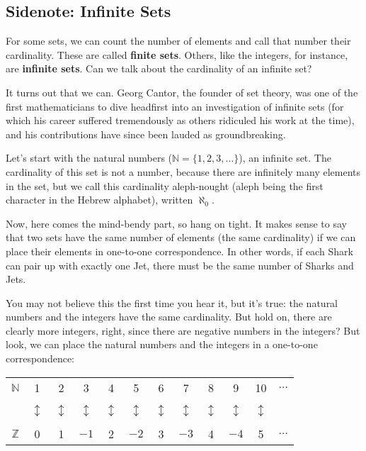 \subsection{Sidenote: Infinite Sets}
For some sets, we can count the number of elements and call that number their cardinality.  These are called \textbf{finite sets}.  Others, like the integers, for instance, are \textbf{infinite sets}.  Can we talk about the cardinality of an infinite set?

It turns out that we can.  Georg Cantor, the founder of set theory, was one of the first mathematicians to dive headfirst into an investigation of infinite sets (for which his career suffered tremendously as others ridiculed his work at the time), and his contributions have since been lauded as groundbreaking.

Let's start with the natural numbers ($\mathbb{N} = \{1,2,3,\ldots\}$), an infinite set.  The cardinality of this set is not a number, because there are infinitely many elements in the set, but we call this cardinality aleph-nought (aleph being the first character in the Hebrew alphabet), written $\aleph_0$.

Now, here comes the mind-bendy part, so hang on tight.  It makes sense to say that two sets have the same number of elements (the same cardinality) if we can place their elements in one-to-one correspondence.  In other words, if each Shark can pair up with exactly one Jet, there must be the same number of Sharks and Jets.

You may not believe this the first time you hear it, but it's true: the natural numbers and the integers have the same cardinality.  But hold on, there are clearly more integers, right, since there are negative numbers in the integers?  But look, we can place the natural numbers and the integers in a one-to-one correspondence:
\begin{center}
\begin{tabular}{c | c c c c c c c c c c c}
$\mathbb{N}$ & 1 & 2 & 3 & 4 & 5 & 6 & 7 & 8 & 9 & 10 & $\ldots$\\
& & & & & & & & & & & \\
& $\updownarrow$ & $\updownarrow$ & $\updownarrow$ & $\updownarrow$ & $\updownarrow$ & $\updownarrow$ & $\updownarrow$ & $\updownarrow$ & $\updownarrow$ & $\updownarrow$ & \\
& & & & & & & & & & & \\
$\mathbb{Z}$ & 0 & 1 & $-1$ & 2 & $-2$ & 3 & $-3$ & 4 & $-4$ & 5 & $\ldots$
\end{tabular}
\end{center}

